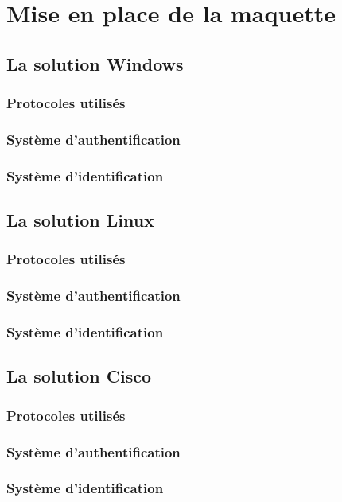 \section{Mise en place de la maquette}
\subsection{La solution Windows}
\subsubsection{Protocoles utilisés}
\subsubsection{Système d'authentification}
\subsubsection{Système d'identification}

\subsection{La solution Linux}
\subsubsection{Protocoles utilisés}
\subsubsection{Système d'authentification}
\subsubsection{Système d'identification}

\subsection{La solution Cisco}
\subsubsection{Protocoles utilisés}
\subsubsection{Système d'authentification}
\subsubsection{Système d'identification}

\pagebreak
